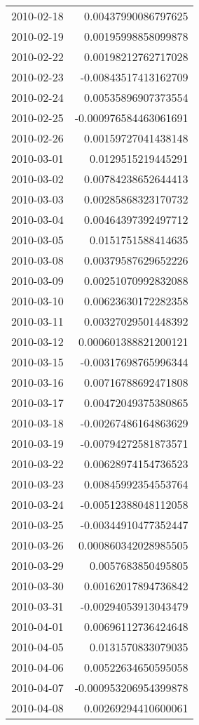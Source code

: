 \begin{tabular}{l | r}
2010-02-18 & 0.00437990086797625 \\
2010-02-19 & 0.00195998858099878 \\
2010-02-22 & 0.00198212762717028 \\
2010-02-23 & -0.00843517413162709 \\
2010-02-24 & 0.00535896907373554 \\
2010-02-25 & -0.000976584463061691 \\
2010-02-26 & 0.00159727041438148 \\
2010-03-01 & 0.0129515219445291 \\
2010-03-02 & 0.00784238652644413 \\
2010-03-03 & 0.00285868323170732 \\
2010-03-04 & 0.00464397392497712 \\
2010-03-05 & 0.0151751588414635 \\
2010-03-08 & 0.00379587629652226 \\
2010-03-09 & 0.00251070992832088 \\
2010-03-10 & 0.00623630172282358 \\
2010-03-11 & 0.00327029501448392 \\
2010-03-12 & 0.000601388821200121 \\
2010-03-15 & -0.00317698765996344 \\
2010-03-16 & 0.00716788692471808 \\
2010-03-17 & 0.00472049375380865 \\
2010-03-18 & -0.00267486164863629 \\
2010-03-19 & -0.00794272581873571 \\
2010-03-22 & 0.00628974154736523 \\
2010-03-23 & 0.00845992354553764 \\
2010-03-24 & -0.00512388048112058 \\
2010-03-25 & -0.00344910477352447 \\
2010-03-26 & 0.000860342028985505 \\
2010-03-29 & 0.0057683850495805 \\
2010-03-30 & 0.00162017894736842 \\
2010-03-31 & -0.00294053913043479 \\
2010-04-01 & 0.00696112736424648 \\
2010-04-05 & 0.0131570833079035 \\
2010-04-06 & 0.00522634650595058 \\
2010-04-07 & -0.000953206954399878 \\
2010-04-08 & 0.00269294410600061 \\

\end{tabular}
